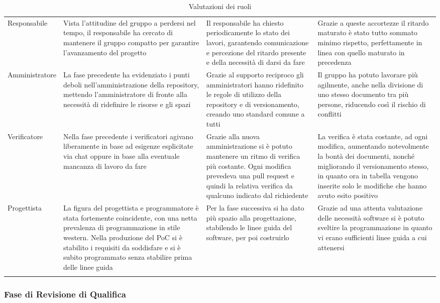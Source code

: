 \documentclass[../piano_di_qualifica.tex]{subfiles}
\begin{document}
\begin{center}
\begin{longtable}{|p{2.5cm}|p{4.5cm}|p{4.5cm}|p{4.5cm}|}
		Responsabile & Vista l’attitudine del gruppo a perdersi nel tempo, il responsabile ha cercato di mantenere il gruppo compatto per garantire l’avanzamento del progetto & Il responsabile ha chiesto periodicamente lo stato dei lavori, garantendo comunicazione e percezione del ritardo presente e della necessità di darsi da fare & Grazie a queste accortezze il ritardo maturato è stato tutto sommato minimo rispetto, perfettamente in linea con quello maturato in precedenza \\
		Amministratore & La fase precedente ha evidenziato i punti deboli nell’amministrazione della repository, mettendo l’amministratore di fronte alla necessità di ridefinire le risorse e gli spazi & Grazie al supporto reciproco gli amministratori hanno ridefinito le regole di utilizzo della repository e di versionamento, creando uno standard comune a tutti & Il gruppo ha potuto lavorare più agilmente, anche nella divisione di uno stesso documento tra più persone, riducendo così il rischio di conflitti  \\
		Verificatore & Nella fase precedente i verificatori agivano liberamente in base ad esigenze esplicitate via chat oppure in base alla eventuale mancanza di lavoro da fare & Grazie alla nuova amministrazione si è potuto mantenere un ritmo di verifica più costante. Ogni modifica prevedeva una pull request e quindi la relativa verifica da qualcuno indicato dal richiedente & La verifica è stata costante, ad ogni modifica, aumentando notevolmente la bontà dei documenti, nonché migliorando il versionamento stesso, in quanto ora in tabella vengono inserite solo le modifiche che hanno avuto esito positivo \\
		Progettista & La figura del progettista e programmatore è stata fortemente coincidente, con una netta prevalenza di programmazione in stile western. Nella produzione del PoC si è stabilito i requisiti da soddisfare e si è subito programmato senza stabilire prima delle linee guida & Per la fase successiva si ha dato più spazio alla progettazione, stabilendo le linee guida del software, per poi costruirlo & Grazie ad una attenta valutazione delle necessità software si è potuto sveltire la programmazione in quanto vi erano sufficienti linee guida a cui attenersi \\

		\hline
		\rowcolor{white}
		\caption{Valutazioni dei ruoli}
	\end{longtable}
\end{center}

\subsubsection{Fase di Revisione di Qualifica}
\end{document}
